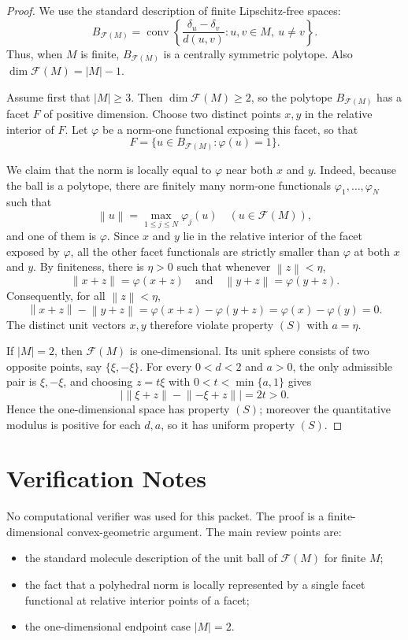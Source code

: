 \documentclass[11pt]{article}
\newcommand{\Free}{\mathcal F}
\newcommand{\Ball}{B}
\newcommand{\norm}[1]{\left\lVert #1 \right\rVert}
\begin{document}
\begin{proof}
We use the standard description of finite Lipschitz-free spaces:
\[
  \Ball_{\Free(M)}
  =
  \operatorname{conv}
  \left\{
  \frac{\delta_u-\delta_v}{d(u,v)}:
  u,v\in M,\ u\neq v
  \right\}.
\]
Thus, when $M$ is finite, $\Ball_{\Free(M)}$ is a centrally symmetric
polytope. Also $\dim \Free(M)=|M|-1$.

Assume first that $|M|\ge 3$. Then $\dim\Free(M)\ge 2$, so the polytope
$\Ball_{\Free(M)}$ has a facet $F$ of positive dimension. Choose two
distinct points $x,y$ in the relative interior of $F$. Let $\varphi$ be a
norm-one functional exposing this facet, so that
\[
  F=\{u\in \Ball_{\Free(M)}:\varphi(u)=1\}.
\]

We claim that the norm is locally equal to $\varphi$ near both $x$ and
$y$. Indeed, because the ball is a polytope, there are finitely many
norm-one functionals $\varphi_1,\ldots,\varphi_N$ such that
\[
  \norm{u}=\max_{1\le j\le N}\varphi_j(u)
  \quad (u\in \Free(M)),
\]
and one of them is $\varphi$. Since $x$ and $y$ lie in the relative
interior of the facet exposed by $\varphi$, all the other facet
functionals are strictly smaller than $\varphi$ at both $x$ and $y$.
By finiteness, there is $\eta>0$ such that whenever $\norm{z}<\eta$,
\[
  \norm{x+z}=\varphi(x+z)
  \quad\text{and}\quad
  \norm{y+z}=\varphi(y+z).
\]
Consequently, for all $\norm{z}<\eta$,
\[
  \norm{x+z}-\norm{y+z}
  =
  \varphi(x+z)-\varphi(y+z)
  =
  \varphi(x)-\varphi(y)
  =
  0.
\]
The distinct unit vectors $x,y$ therefore violate property $(S)$ with
$a=\eta$.

If $|M|=2$, then $\Free(M)$ is one-dimensional. Its unit sphere consists
of two opposite points, say $\{\xi,-\xi\}$. For every $0<d<2$ and $a>0$,
the only admissible pair is $\xi,-\xi$, and choosing
$z=t\xi$ with $0<t<\min\{a,1\}$ gives
\[
  |\norm{\xi+z}-\norm{-\xi+z}|=2t>0.
\]
Hence the one-dimensional space has property $(S)$; moreover the
quantitative modulus is positive for each $d,a$, so it has uniform
property $(S)$.
\end{proof}

\section*{Verification Notes}

No computational verifier was used for this packet. The proof is a
finite-dimensional convex-geometric argument. The main review points are:

\begin{itemize}
\item the standard molecule description of the unit ball of $\Free(M)$
for finite $M$;
\item the fact that a polyhedral norm is locally represented by a single
facet functional at relative interior points of a facet;
\item the one-dimensional endpoint case $|M|=2$.
\end{itemize}
\end{document}
